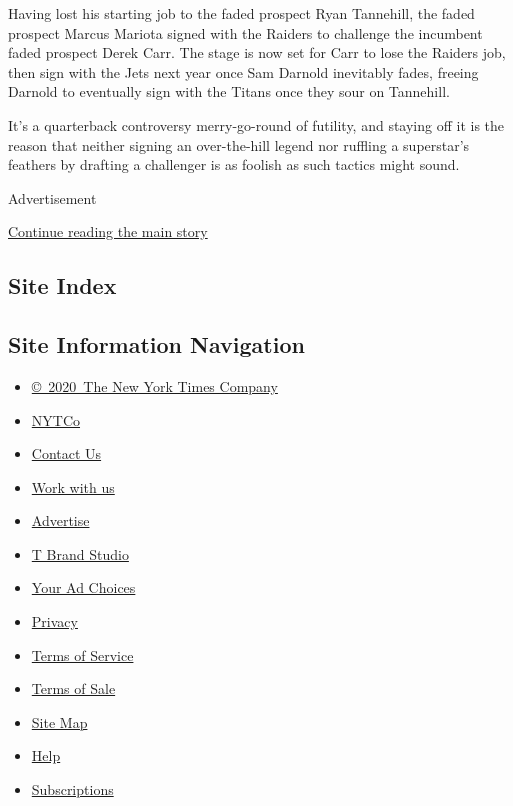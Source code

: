 Having lost his starting job to the faded prospect Ryan Tannehill, the
faded prospect Marcus Mariota signed with the Raiders to challenge the
incumbent faded prospect Derek Carr. The stage is now set for Carr to
lose the Raiders job, then sign with the Jets next year once Sam Darnold
inevitably fades, freeing Darnold to eventually sign with the Titans
once they sour on Tannehill.

It's a quarterback controversy merry-go-round of futility, and staying
off it is the reason that neither signing an over-the-hill legend nor
ruffling a superstar's feathers by drafting a challenger is as foolish
as such tactics might sound.

Advertisement

\protect\hyperlink{after-bottom}{Continue reading the main story}

\hypertarget{site-index}{%
\subsection{Site Index}\label{site-index}}

\hypertarget{site-information-navigation}{%
\subsection{Site Information
Navigation}\label{site-information-navigation}}

\begin{itemize}
\tightlist
\item
  \href{https://help.nytimes3xbfgragh.onion/hc/en-us/articles/115014792127-Copyright-notice}{©~2020~The
  New York Times Company}
\end{itemize}

\begin{itemize}
\tightlist
\item
  \href{https://www.nytco.com/}{NYTCo}
\item
  \href{https://help.nytimes3xbfgragh.onion/hc/en-us/articles/115015385887-Contact-Us}{Contact
  Us}
\item
  \href{https://www.nytco.com/careers/}{Work with us}
\item
  \href{https://nytmediakit.com/}{Advertise}
\item
  \href{http://www.tbrandstudio.com/}{T Brand Studio}
\item
  \href{https://www.nytimes3xbfgragh.onion/privacy/cookie-policy\#how-do-i-manage-trackers}{Your
  Ad Choices}
\item
  \href{https://www.nytimes3xbfgragh.onion/privacy}{Privacy}
\item
  \href{https://help.nytimes3xbfgragh.onion/hc/en-us/articles/115014893428-Terms-of-service}{Terms
  of Service}
\item
  \href{https://help.nytimes3xbfgragh.onion/hc/en-us/articles/115014893968-Terms-of-sale}{Terms
  of Sale}
\item
  \href{https://spiderbites.nytimes3xbfgragh.onion}{Site Map}
\item
  \href{https://help.nytimes3xbfgragh.onion/hc/en-us}{Help}
\item
  \href{https://www.nytimes3xbfgragh.onion/subscription?campaignId=37WXW}{Subscriptions}
\end{itemize}
